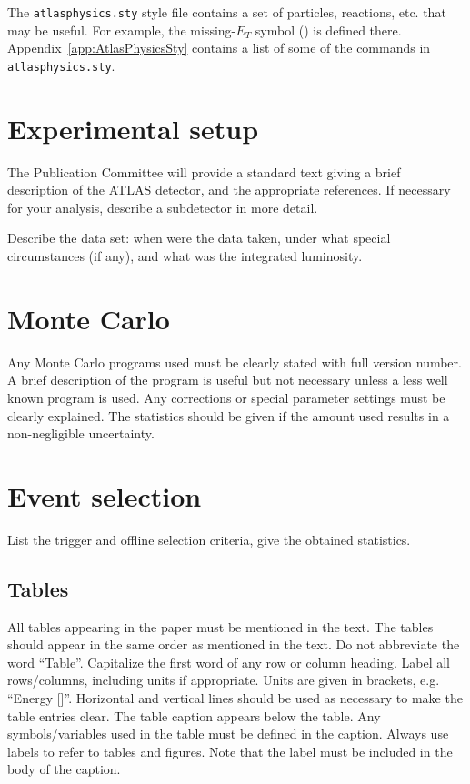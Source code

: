 \documentclass[11pt,a4paper]{atlasnote}
\begin{document}
The {\tt atlasphysics.sty} style file contains a set of particles,
reactions, etc. that may be useful. For example, the missing-$E_T$
symbol (\met{}) is defined there. Appendix~\ref{app:AtlasPhysicsSty}
contains a list of some of the commands in {\tt atlasphysics.sty}.

\section{Experimental setup}

The Publication Committee will provide a standard text giving a brief
description of the ATLAS detector, and the appropriate references.  If
necessary for your analysis, describe a subdetector in more detail.

Describe the data set: when were the data taken, under what special
circumstances (if any), and what was the integrated luminosity.

\section{Monte Carlo}

Any Monte Carlo programs used must be clearly stated with full version
number. A brief description of the program is useful but not necessary
unless a less well known program is used.  Any corrections or special
parameter settings must be clearly explained.  The statistics should
be given if the amount used results in a non-negligible uncertainty.

\section{Event selection}

List the trigger and offline selection criteria, give the obtained
statistics.

\subsection{Tables}

All tables appearing in the paper must be mentioned in the text. The
tables should appear in the same order as mentioned in the text. Do
not abbreviate the word ``Table''. Capitalize the first word of any
row or column heading. Label all rows/columns, including units if
appropriate. Units are given in brackets, e.g. ``Energy [\gev]''.
Horizontal and vertical lines should be used as necessary to make the
table entries clear. 
The table caption appears below the table.  
Any symbols/variables used in the table must be defined in the
caption.  Always use labels to refer to tables and figures. Note that
the label must be included in the body of the caption.
\end{document}
